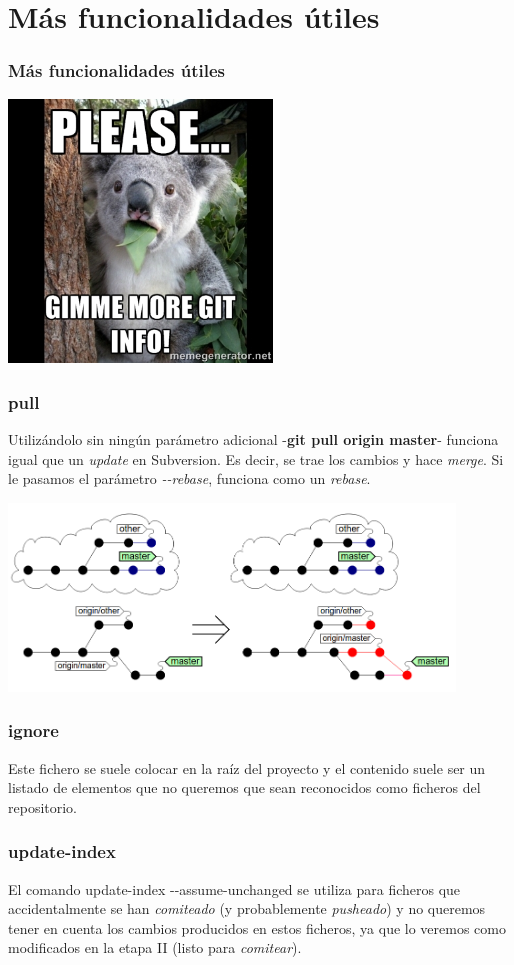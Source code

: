 \section{Más funcionalidades útiles}
\frame
{
\frametitle{Más funcionalidades útiles}
\begin{center}
 \includegraphics[height=7cm]{imgs/koala.jpg} 
\end{center}
}

\frame
{
\frametitle{pull}
Utilizándolo sin ningún parámetro adicional -\textbf{git pull origin master}- funciona igual que un \textit{update} en Subversion. Es decir, se trae los cambios y hace \textit{merge}. Si le pasamos el parámetro \textit{-{}-rebase}, funciona como un \textit{rebase}.

\includegraphics[height=5cm]{imgs/pull.png} 
}

\frame
{
\frametitle{ignore}
Este fichero se suele colocar en la raíz del proyecto y el contenido suele ser un listado de elementos que no queremos que sean reconocidos como ficheros del repositorio. 
}

\frame
{
\frametitle{update-index}
El comando update-index -{}-assume-unchanged se utiliza para ficheros que accidentalmente se han \textit{comiteado} (y probablemente \textit{pusheado}) y no queremos tener en cuenta los cambios producidos en estos ficheros, ya que lo veremos como modificados en la etapa II (listo para \textit{comitear}).
}

